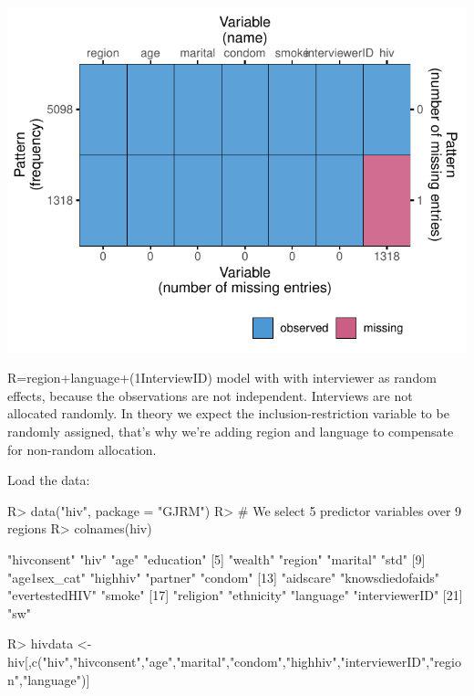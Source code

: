 \documentclass[
]{jss}
\begin{document}
\begin{CodeChunk}


\begin{center}\includegraphics{Imputation_of_Incomplete_Multilevel_Data_files/figure-latex/hiv-1} \end{center}

\end{CodeChunk}

R=region+language+(1\textbar InterviewID) model with with interviewer as
random effects, because the observations are not independent. Interviews
are not allocated randomly. In theory we expect the
inclusion-restriction variable to be randomly assigned, that's why we're
adding region and language to compensate for non-random allocation.

Load the data:

\begin{CodeChunk}
\begin{CodeInput}
R> data("hiv",  package = "GJRM")
R> # We select  5 predictor variables over 9 regions
R> colnames(hiv)
\end{CodeInput}
\begin{CodeOutput}
 [1] "hivconsent"      "hiv"             "age"             "education"      
 [5] "wealth"          "region"          "marital"         "std"            
 [9] "age1sex_cat"     "highhiv"         "partner"         "condom"         
[13] "aidscare"        "knowsdiedofaids" "evertestedHIV"   "smoke"          
[17] "religion"        "ethnicity"       "language"        "interviewerID"  
[21] "sw"             
\end{CodeOutput}
\begin{CodeInput}
R> hivdata <- hiv[,c("hiv","hivconsent","age","marital","condom","highhiv","interviewerID","region","language")]
\end{CodeInput}
\end{CodeChunk}
\end{document}
